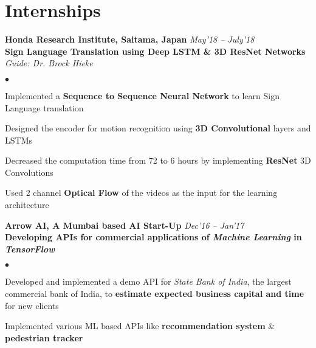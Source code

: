 \documentclass[margin,line, 9pt]{res}
\newenvironment{list2}{
  \begin{list}{$\bullet$}{%
      \setlength{\itemsep}{0.03in}
      \setlength{\parsep}{0in} \setlength{\parskip}{0in}
      \setlength{\topsep}{0in} \setlength{\partopsep}{0in} 
      \setlength{\leftmargin}{0.2in}}}{\end{list}}
\begin{document}
\section{\sc Internships}
%
{\bf Honda Research Institute, Saitama, Japan} \hfill {\it May'18 -- July'18} \\
\textbf{Sign Language Translation using Deep LSTM \& 3D ResNet Networks} \\
{\em Guide: Dr. Brock Hieke}  \\
\vspace*{-.13in}
\begin{list2}
\item Implemented a \textbf{Sequence to Sequence Neural Network} to learn Sign Language translation 
\item Designed the encoder for motion recognition using \textbf{3D Convolutional} layers and LSTMs
\item Decreased the computation time from 72 to 6 hours by implementing \textbf{ResNet} 3D Convolutions
\item Used 2 channel \textbf{Optical Flow} of the videos as the input for the learning architecture
\end{list2}
%
%
{\bf Arrow AI, A Mumbai based AI Start-Up}  \hfill {\it Dec'16 -- Jan'17} \\
\textbf{Developing APIs for commercial applications of \emph{Machine Learning} in \emph{TensorFlow}}\\
\vspace*{-.13in} 
\begin{list2}
\item Developed and implemented a demo API for \emph{State Bank of India}, the largest commercial bank of India, to \textbf{estimate expected business capital and time} for new clients
\item Implemented various ML based APIs like \textbf{recommendation system} \& \textbf{pedestrian tracker}
\end{list2}
%
\end{document}
